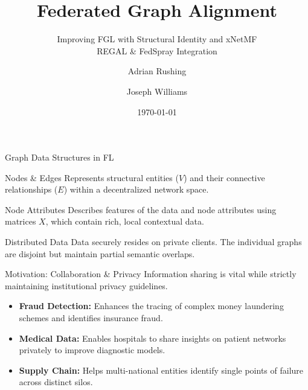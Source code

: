 \documentclass[11pt, aspectratio=169]{beamer}
\title[Federated Graph Alignment]{Federated Graph Alignment}
\subtitle{Improving FGL with Structural Identity and xNetMF \\ REGAL \& FedSpray Integration}
\author[Rushing \& Williams]{Adrian Rushing \and Joseph Williams}
\date{\today}
\begin{document}
\begin{frame}
    \titlepage
\end{frame}

\begin{frame}{Graph Data Structures in FL}
    \begin{block}{Nodes \& Edges}
        Represents structural entities ($V$) and their connective relationships ($E$) within a decentralized network space.
    \end{block}
    
    \vspace{0.3cm}
    \begin{block}{Node Attributes}
        Describes features of the data and node attributes using matrices $X$, which contain rich, local contextual data.
    \end{block}
    
    \vspace{0.3cm}
    \begin{block}{Distributed Data}
        Data securely resides on private clients. The individual graphs are disjoint but maintain partial semantic overlaps.
    \end{block}
\end{frame}

\begin{frame}{Motivation: Collaboration \& Privacy}
    Information sharing is vital while strictly maintaining institutional privacy guidelines.
    
    \vspace{0.5cm}
    \begin{itemize}
        \item \textbf{Fraud Detection:} Enhances the tracing of complex money laundering schemes and identifies insurance fraud.
        \vspace{0.3cm}
        \item \textbf{Medical Data:} Enables hospitals to share insights on patient networks privately to improve diagnostic models.
        \vspace{0.3cm}
        \item \textbf{Supply Chain:} Helps multi-national entities identify single points of failure across distinct silos.
    \end{itemize}
\end{frame}
\end{document}
